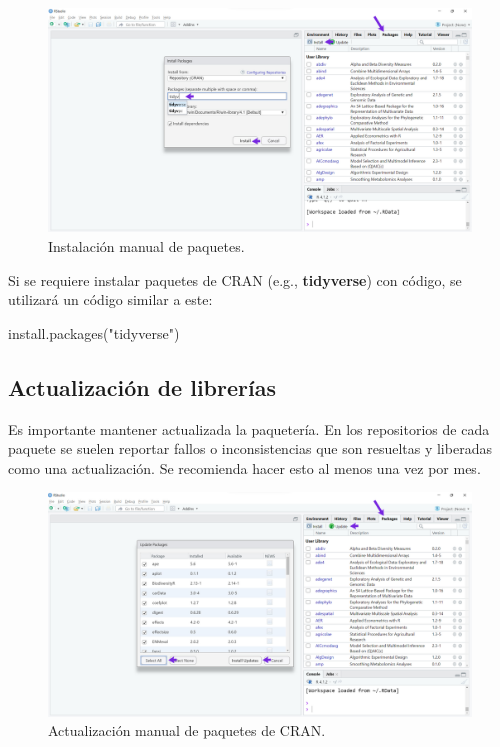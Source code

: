 \documentclass[
]{article}
\newenvironment{Shaded}{\begin{snugshade}}{\end{snugshade}}
\newcommand{\FunctionTok}[1]{\textcolor[rgb]{0.00,0.00,0.00}{#1}}
\newcommand{\NormalTok}[1]{#1}
\newcommand{\StringTok}[1]{\textcolor[rgb]{0.31,0.60,0.02}{#1}}
\theoremstyle{definition}
\theoremstyle{definition}
\theoremstyle{definition}
\theoremstyle{definition}
\theoremstyle{remark}
\begin{document}
\begin{figure}

{\centering \includegraphics[width=1\linewidth]{figs/screenshots/paquetes instalacion} 

}

\caption{Instalación manual de paquetes.}\label{fig:figura19}
\end{figure}

Si se requiere instalar paquetes de CRAN (e.g., \textbf{tidyverse}) con código, se utilizará un código similar a este:

\begin{Shaded}
\begin{Highlighting}[]
\FunctionTok{install.packages}\NormalTok{(}\StringTok{"tidyverse"}\NormalTok{)}
\end{Highlighting}
\end{Shaded}

\hypertarget{actualizaciuxf3n-de-libreruxedas}{%
\subsection{Actualización de librerías}\label{actualizaciuxf3n-de-libreruxedas}}

Es importante mantener actualizada la paquetería. En los repositorios de cada paquete se suelen reportar fallos o inconsistencias que son resueltas y liberadas como una actualización. Se recomienda hacer esto al menos una vez por mes.



\begin{figure}

{\centering \includegraphics[width=1\linewidth]{figs/screenshots/paquetes actualizacion} 

}

\caption{Actualización manual de paquetes de CRAN.}\label{fig:figura20}
\end{figure}
\end{document}
